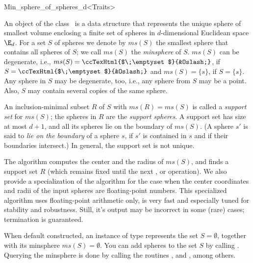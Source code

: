 
\begin{ccRefClass}{Min_sphere_of_spheres_d<Traits>}

\ccDefinition

An object of the class \ccRefName\ is a data structure that represents
the unique sphere of smallest volume enclosing a finite set of spheres
in $d$-dimensional Euclidean space $\E_d$.  For a set $S$ of spheres
we denote by $ms(S)$ the smallest sphere that contains all spheres of
$S$; we call $ms(S)$ the \emph{minsphere} of $S$. $ms(S)$ can be
degenerate, i.e., $ms(S)=\mbox{\ccTexHtml{$\;\emptyset$}{&Oslash;}}$,
if $S=\mbox{\ccTexHtml{$\;\emptyset$}{&Oslash;}}$ and $ms(S)=\{s\}$,
if $S=\{s\}$.  Any sphere in $S$ may be degenerate, too, i.e., any
sphere from $S$ may be a point.  Also, $S$ may contain several
copies of the same sphere.

An inclusion-minimal subset $R$ of $S$ with $ms(R)=ms(S)$ is called a
\emph{support set} for $ms(S)$; the spheres in $R$ are the
\emph{support spheres}.  A support set has size at most $d+1$, and all
its spheres lie on the boundary of $ms(S)$. (A sphere $s'$ is said to
\emph{lie on the boundary} of a sphere $s$, if $s'$ is contained in $s$
and if their boundaries intersect.)  In general, the support set is
not unique.

The algorithm computes the center and the radius of $ms(S)$, and finds
a support set $R$ (which remains fixed until the next ,
 or  operation).  We also provide a
specialization of the algorithm for the case when the center
coordinates and radii of the input spheres are floating-point numbers.
This specialized algorithm uses floating-point arithmetic only, is
very fast and especially tuned for stability and robustness.  Still,
it's output may be incorrect in some (rare) cases; termination is
guaranteed.

When default constructed, an instance of type
 represents the set
$S=\emptyset$, together with its minsphere $ms(S)=\emptyset$.  You can
add spheres to the set $S$ by calling .  Querying the
minsphere is done by calling the routines ,
 and , among others.


\end{ccRefClass}
